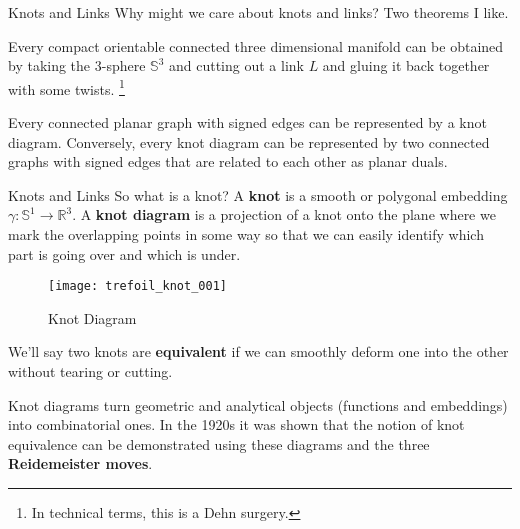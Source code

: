 \documentclass{beamer}
\begin{document}
    \begin{frame}{Knots and Links}
        Why might we care about knots and links? Two theorems I like.
        \begin{theorem}
            Every compact orientable connected three dimensional manifold
            can be obtained by taking the 3-sphere $\mathbb{S}^{3}$ and cutting
            out a link $L$ and gluing it back together with some twists.%
            \footnote{In technical terms, this is a Dehn surgery.}
        \end{theorem}
        \begin{theorem}
            Every connected planar graph with signed edges can be represented
            by a knot diagram. Conversely, every knot diagram can be
            represented by two connected graphs with signed edges that are
            related to each other as planar duals.
        \end{theorem}
    \end{frame}
    \begin{frame}{Knots and Links}
        So what is a knot?
        A \textbf{knot} is a smooth or polygonal embedding
        $\gamma:\mathbb{S}^{1}\rightarrow\mathbb{R}^{3}$.
        A \textbf{knot diagram} is a projection of a knot onto the plane where
        we mark the overlapping points in some way so that we can easily
        identify which part is going over and which is under.
        \begin{figure}
            \centering
            \texttt{[image: trefoil\_knot\_001]}
            \caption{Knot Diagram}
        \end{figure}
    \end{frame}
    \begin{frame}
        We'll say two knots are \textbf{equivalent} if we can
        smoothly deform one into the other without tearing or cutting.
        \par\hfill\par
        Knot diagrams turn geometric and analytical objects
        (functions and embeddings) into combinatorial ones. In the 1920s it was
        shown that the notion of knot equivalence can be demonstrated
        using these diagrams and the three \textbf{Reidemeister moves}.
    \end{frame}
\end{document}
